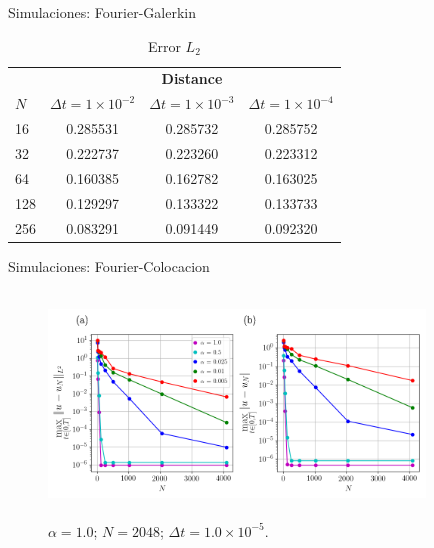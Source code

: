 \begin{frame}{Simulaciones: Fourier-Galerkin \hspace{2cm} \hyperlink{Navegador}{}}    
	\begin{table}
		\centering
		\begin{tabular}{lccc}
			\toprule
			\multicolumn{1}{c}{}& \multicolumn{3}{c}{\textbf{Distance}} \\
			$N$& $\Delta t=1\times 10^{-2}$& $\Delta t=1\times 10^{-3}$& $\Delta t=1\times 10^{-4}$ \\
			\midrule
			16& 0.285531& 0.285732& 0.285752 \\
			\midrule
			32& 0.222737& 0.223260& 0.223312 \\
			\midrule
			64& 0.160385& 0.162782& 0.163025 \\
			\midrule
			128& 0.129297& 0.133322& 0.133733 \\
			\midrule
			256& 0.083291& 0.091449& 0.092320 \\
			\bottomrule
		\end{tabular}
		\caption{Error $L_2$}
	\end{table}
\end{frame}
\label{Figuras-Colocacion}
\begin{frame}{Simulaciones: Fourier-Colocacion \hspace{2cm} \hyperlink{Navegador}{}}
    \begin{figure}
	    \centering
    	\includegraphics[height=6cm,width=10cm]{files/figures/viscid/collocation/alphas_Error_N.png}
    	\caption{$\alpha = 1.0$; $N=2048$; $\Delta t = 1.0 \times 10^{-5}$.}
	\end{figure}
\end{frame}

